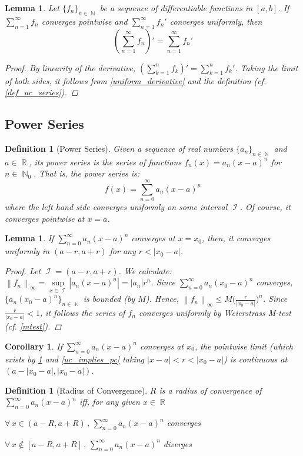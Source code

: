 \documentclass[12pt]{article}
\newcommand{\Forall}[1]{\forall\,{#1}\,,\,}
\DeclareMathOperator{\R}{\mathbb{R}}
\DeclareMathOperator{\N}{\mathbb{N}}
\DeclareMathOperator{\I}{\mathcal{I}}
\newcommand{\seq}[2]{\{{#1}\}_{#2\in\N}}
\newcommand{\fsup}[1]{\left\|#1\right\|_\infty}
\newtheorem{definition}[theorem]{Definition}
\newtheorem{lemma}[theorem]{Lemma}
\newtheorem{corollary}[theorem]{Corollary}
\begin{document}
\begin{lemma}
  Let $\seq{f_n}{n}$ be a sequence of differentiable functions in $[a,b]$. If $\sum_{n=1}^\infty f_n$ converges pointwise and $\sum_{n=1}^\infty f_n'$ converges uniformly, then $$\left(\sum_{n=1}^\infty f_n\right)'=\sum_{n=1}^\infty f_n'$$
  \begin{proof}
    By linearity of the derivative, $\left(\sum_{k=1}^n f_k\right)'=\sum_{k=1}^n f_k'$. Taking the limit of both sides, it follows from \ref{uniform_derivative} and the definition (cf. \ref{def_uc_series}).
  \end{proof}
\end{lemma}

\pagebreak

\subsection{Power Series}

\begin{definition}[Power Series]
  Given a sequence of real numbers $\seq{a_n}{n}$ and $a\in\R$, its power series is the series of functions $f_n(x)=a_n(x-a)^n$ for $n\in\N_0$. That is, the power series is: $$f(x)=\sum_{n=0}^\infty a_n(x-a)^n$$ where the left hand side converges uniformly on some interval $\I$. Of course, it converges pointwise at $x=a$.
\end{definition}

\begin{lemma}
  \label{ps_bound}
  If $\sum_{n=0}^\infty a_n(x-a)^n$ converges at $x=x_0$, then, it converges uniformly in $(a-r,a+r)$ for any $r<|x_0-a|$.
  \begin{proof}
    Let $\I=(a-r,a+r)$. We calculate: $\fsup{f_n}=\sup\limits_{x\in\I}|a_n(x-a)^n|=|a_n|r^n$. Since $\sum_{n=0}^\infty a_n(x_0-a)^n$ converges, $\seq{a_n(x_0-a)^n}{n}$ is bounded (by $M$). Hence, $\fsup{f_n}\leq M\big(\frac{r}{|x_0-a|}\big)^n$. Since $\frac{r}{|x_0-a|}<1$, it follows the series of $f_n$ converges uniformly by Weierstrass M-test (cf. \ref{mtest}).
  \end{proof}
\end{lemma}

\begin{corollary}
  If $\sum_{n=0}^\infty a_n(x-a)^n$ converges at $x_0$, the pointwise limit (which exists by \ref{ps_bound} and \ref{uc_implies_pc} taking $|x-a|<r<|x_0-a|$) is continuous at $(a-|x_0-a|,|x_0-a|)$.
\end{corollary}

\begin{definition}[Radius of Convergence]
  \label{def_radc}
  $R$ is a radius of convergence of $\sum_{n=0}^\infty a_n(x-a)^n$ iff, for any given $x\in\R$
  \begin{compactitem}
    \item[] $\Forall{x\in(a-R,a+R)}\sum_{n=0}^\infty a_n(x-a)^n$ converges
    \item[] $\Forall{x\notin[a-R,a+R]}\sum_{n=0}^\infty a_n(x-a)^n$ diverges
  \end{compactitem}
\end{definition}
\end{document}
